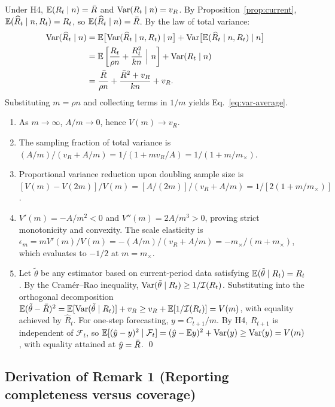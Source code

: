 Under H4, $\mathbb{E}(R_t \mid n) = \bar{R}$ and $\mathrm{Var}(R_t \mid n) = v_R$. By Proposition~\ref{prop:current}, $\mathbb{E}(\widehat{R}_t \mid n, R_t) = R_t$, so $\mathbb{E}(\widehat{R}_t \mid n) = \bar{R}$. By the law of total variance:
\begin{align}
  \mathrm{Var}(\widehat{R}_t \mid n) &= \mathbb{E}\big[\mathrm{Var}(\widehat{R}_t \mid n, R_t)\mid n\big] + \mathrm{Var}\big[\mathbb{E}(\widehat{R}_t \mid n, R_t)\mid n\big] \nonumber \\
  &= \mathbb{E}\left[\frac{R_t}{\rho n} + \frac{R_t^2}{kn}\ \Big|\ n\right] + \mathrm{Var}(R_t \mid n) \nonumber \\
  &= \frac{\bar{R}}{\rho n} + \frac{\bar{R}^2 + v_R}{kn} + v_R.
\end{align}
Substituting $m = \rho n$ and collecting terms in $1/m$ yields Eq.~\eqref{eq:var-average}.
\begin{enumerate}[label=(\roman*)]
  \item As $m \to \infty$, $A/m \to 0$, hence $V(m) \to v_R$.
  \item The sampling fraction of total variance is $(A/m)/(v_R + A/m) = 1/(1 + m v_R / A) = 1/(1 + m/m_\times)$.
  \item Proportional variance reduction upon doubling sample size is $[V(m) - V(2m)]/V(m) = [A/(2m)]/(v_R + A/m) = 1/[2(1 + m/m_\times)]$.
  \item $V'(m) = -A/m^2 < 0$ and $V''(m) = 2A/m^3 > 0$, proving strict monotonicity and convexity. The scale elasticity is $\epsilon_m = m V'(m)/V(m) = -(A/m)/(v_R + A/m) = -m_\times / (m + m_\times)$, which evaluates to $-1/2$ at $m = m_\times$.
  \item Let $\tilde{\theta}$ be any estimator based on current-period data satisfying $\mathbb{E}(\tilde{\theta} \mid R_t) = R_t$. By the Cram\'er--Rao inequality, $\mathrm{Var}(\tilde{\theta} \mid R_t) \ge 1/\mathcal{I}(R_t)$. Substituting into the orthogonal decomposition $\mathbb{E}(\tilde{\theta} - \bar{R})^2 = \mathbb{E}[\mathrm{Var}(\tilde{\theta} \mid R_t)] + v_R \ge v_R + \mathbb{E}[1/\mathcal{I}(R_t)] = V(m)$, with equality achieved by $\widehat{R}_t$. For one-step forecasting, $y = C_{t+1}/m$. By H4, $R_{t+1}$ is independent of $\mathcal{F}_t$, so $\mathbb{E}[(\hat{y} - y)^2 \mid \mathcal{F}_t] = (\hat{y} - \mathbb{E} y)^2 + \mathrm{Var}(y) \ge \mathrm{Var}(y) = V(m)$, with equality attained at $\hat{y} = \bar{R}$. \qed
\end{enumerate}

\subsection{Derivation of Remark 1 (Reporting completeness versus coverage)}
\label{sec:proof-rem1}

